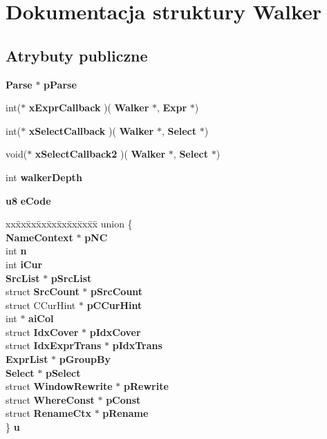 \section{Dokumentacja struktury Walker}
\label{struct_walker}
\subsection*{Atrybuty publiczne}
\begin{DoxyCompactItemize}
\item 
\textbf{ Parse} $\ast$ \textbf{ p\+Parse}
\item 
int($\ast$ \textbf{ x\+Expr\+Callback} )(\textbf{ Walker} $\ast$, \textbf{ Expr} $\ast$)
\item 
int($\ast$ \textbf{ x\+Select\+Callback} )(\textbf{ Walker} $\ast$, \textbf{ Select} $\ast$)
\item 
void($\ast$ \textbf{ x\+Select\+Callback2} )(\textbf{ Walker} $\ast$, \textbf{ Select} $\ast$)
\item 
int \textbf{ walker\+Depth}
\item 
\textbf{ u8} \textbf{ e\+Code}
\item 
\begin{tabbing}
xx\=xx\=xx\=xx\=xx\=xx\=xx\=xx\=xx\=\kill
union \{\\
\>\textbf{ NameContext} $\ast$ \textbf{ pNC}\\
\>int \textbf{ n}\\
\>int \textbf{ iCur}\\
\>\textbf{ SrcList} $\ast$ \textbf{ pSrcList}\\
\>struct \textbf{ SrcCount} $\ast$ \textbf{ pSrcCount}\\
\>struct CCurHint $\ast$ \textbf{ pCCurHint}\\
\>int $\ast$ \textbf{ aiCol}\\
\>struct \textbf{ IdxCover} $\ast$ \textbf{ pIdxCover}\\
\>struct \textbf{ IdxExprTrans} $\ast$ \textbf{ pIdxTrans}\\
\>\textbf{ ExprList} $\ast$ \textbf{ pGroupBy}\\
\>\textbf{ Select} $\ast$ \textbf{ pSelect}\\
\>struct \textbf{ WindowRewrite} $\ast$ \textbf{ pRewrite}\\
\>struct \textbf{ WhereConst} $\ast$ \textbf{ pConst}\\
\>struct \textbf{ RenameCtx} $\ast$ \textbf{ pRename}\\
\} \textbf{ u}\\

\end{tabbing}\end{DoxyCompactItemize}


